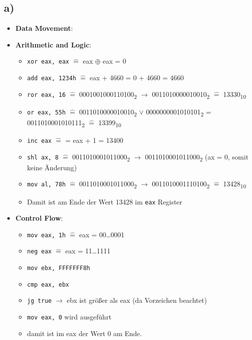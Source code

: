 \documentclass[]{scrreprt}
\begin{document}
\subsection*{a)}
\begin{itemize}
		\item \textbf{Data Movement}:
		
		\item  \textbf{Arithmetic and Logic}:
		\begin{itemize}
			\item \texttt{xor eax, eax} $\hat{=}$ eax $\oplus$ eax = 0
			\item \texttt{add eax, 1234h} $\hat{=}$ eax + 4660 = 0 + 4660 = 4660
			\item \texttt{ror eax, 16} $\hat{=}$ {0001001000110100}\textsubscript{2} $\rightarrow$ {0011010000010010}\textsubscript{2} $\hat{=}$  {13330}\textsubscript{10}
			\item \texttt{or eax, 55h} $\hat{=}$ {0011010000010010}\textsubscript{2} $\vee$ {0000000001010101}\textsubscript{2} = {0011010001010111}\textsubscript{2} $\hat{=}$ {13399}\textsubscript{10}
			\item \texttt{inc eax} $\hat{=}$ = eax + 1 = 13400
			\item \texttt{shl ax, 8} $\hat{=}$ 0011010001011000\textsubscript{2} $\rightarrow$ 0011010001011000\textsubscript{2} (ax = 0, somit keine Änderung)
			\item  \texttt{mov al, 78h} $\hat{=}$ 0011010001011000\textsubscript{2} $\rightarrow$ 0011010001110100\textsubscript{2} $\hat{=}$ 13428\textsubscript{10}
			\item Damit ist am Ende der Wert 13428 im \texttt{eax} Register
\end{itemize}
		
\item \textbf{Control Flow}:
\begin{itemize}
\item \texttt{mov eax, 1h} $\hat{=}$ eax = 00\dots0001
\item \texttt{neg eax} $\hat{=}$ eax = 11\dots1111
\item \texttt{mov ebx, FFFFFFF8h}
\item \texttt{cmp eax, ebx} 
\item \texttt{jg true} $\rightarrow$ ebx ist größer als eax (da Vorzeichen beachtet)
\item \texttt{mov eax, 0} wird ausgeführt
\item damit ist im eax der Wert 0 am Ende.
\end{itemize}
\end{itemize}
\end{document}
